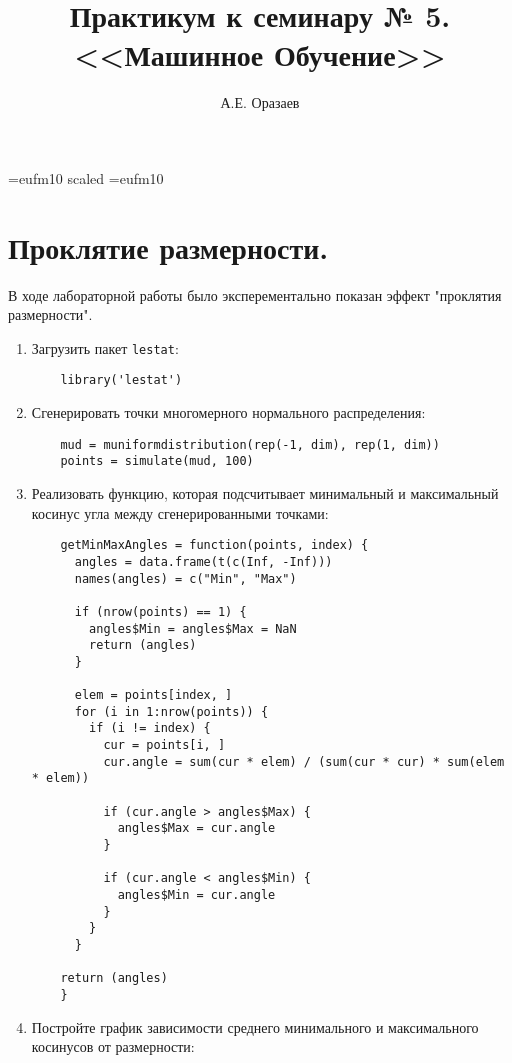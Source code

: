 \documentclass[12pt]{article}
\title{\bf Практикум к семинару № 5. \\ <<Машинное
Обучение>>}
\author{А.Е. Оразаев}
\date{}
\begin{document}
\voffset=-20mm
\hoffset=-12mm
\font\Got=eufm10 scaled \font\Got=eufm10

\maketitle

\section{Проклятие размерности.}
В ходе лабораторной работы было эксперементально показан эффект
"проклятия размерности".
\begin{enumerate}
    \item Загрузить пакет \verb=lestat=:
    \begin{verbatim}
    library('lestat')
    \end{verbatim}

    \item Сгенерировать точки многомерного нормального распределения:
    \begin{verbatim}
    mud = muniformdistribution(rep(-1, dim), rep(1, dim))
    points = simulate(mud, 100)
    \end{verbatim}

    \item Реализовать функцию, которая подсчитывает минимальный и
          максимальный косинус угла между сгенерированными точками:
    \begin{verbatim}
    getMinMaxAngles = function(points, index) {
      angles = data.frame(t(c(Inf, -Inf)))
      names(angles) = c("Min", "Max")
    
      if (nrow(points) == 1) {
        angles$Min = angles$Max = NaN
        return (angles)
      }
    
      elem = points[index, ]
      for (i in 1:nrow(points)) {
        if (i != index) {
          cur = points[i, ]
          cur.angle = sum(cur * elem) / (sum(cur * cur) * sum(elem * elem))
    
          if (cur.angle > angles$Max) {
            angles$Max = cur.angle
          }
    
          if (cur.angle < angles$Min) {
            angles$Min = cur.angle
          }
        }
      }

    return (angles)
    }
    \end{verbatim}

    \item Постройте график зависимости среднего минимального и максимального
          косинусов от размерности:
    \begin{center}
    \end{center}


\end{enumerate}
\end{document}
